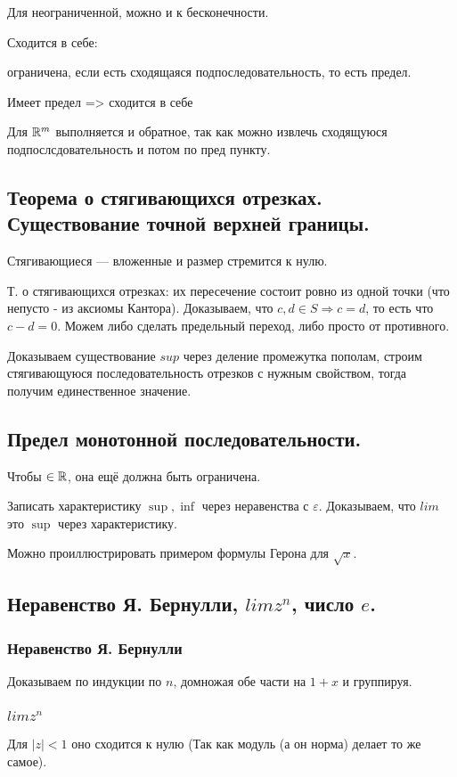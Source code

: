 \documentclass[12pt, a4paper]{article}
\begin{document}
Для неограниченной, можно и к бесконечности.

Сходится в себе: 

ограничена, если есть сходящаяся подпоследовательность, то есть предел.

Имеет предел => сходится в себе

Для ${\mathbb{R}}^m$ выполняется и обратное, так как можно извлечь сходящуюся подпослсдовательность и потом по пред пункту.


\subsection{Теорема о стягивающихся отрезках. Существование точной верхней границы.}

Стягивающиеся — вложенные и размер стремится к нулю.

Т. о стягивающихся отрезках: их пересечение состоит ровно из одной точки (что непусто - из аксиомы Кантора).
Доказываем, что $c, d \in S \Rightarrow c = d$, то есть что $c - d = 0$.
Можем либо сделать предельный переход, либо просто от противного.


Доказываем существование $sup$ через деление промежутка пополам, строим 
стягивающуюся последовательность отрезков с нужным свойством, 
тогда получим единественное значение.


\subsection{Предел монотонной последовательности.}


Чтобы $\in {\mathbb{R}}$, она ещё должна быть ограничена.

Записать характеристику $\sup, \inf$ через неравенства с $\varepsilon$.
Доказываем, что $lim$ это $\sup$ через характеристику.

Можно проиллюстрировать примером формулы Герона для $\sqrt{x}$.

\subsection{Неравенство Я. Бернулли, $lim z^n$, число $e$.}

\subsubsection{Неравенство Я. Бернулли}
    Доказываем по индукции по $n$, домножая обе части на $1 + x$ и группируя.

\subsubsection{$lim z^n$}
    Для $|z| < 1$ оно сходится к нулю (Так как модуль (а он норма) делает то же самое).
\end{document}
